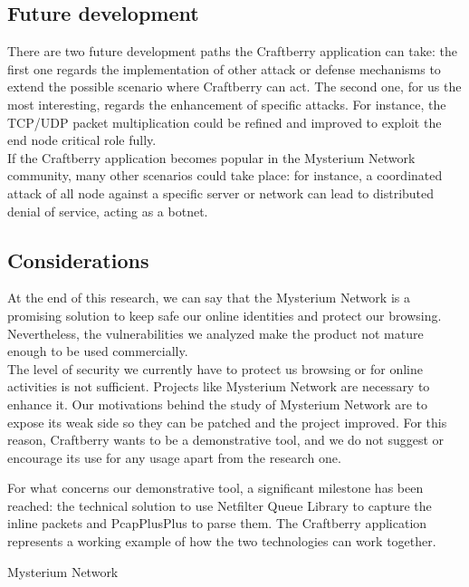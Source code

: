 \documentclass[12pt]{article}
\begin{document}
		\subsection{Future development}
			There are two future development paths the Craftberry application can take: the first one regards the implementation of other attack or defense mechanisms to extend the possible scenario where Craftberry can act. The second one, for us the most interesting, regards the enhancement of specific attacks. For instance, the TCP/UDP packet multiplication could be refined and improved to exploit the end node critical role fully.\\
			If the Craftberry application becomes popular in the Mysterium Network community, many other scenarios could take place: for instance, a coordinated attack of all node against a specific server or network can lead to distributed denial of service, acting as a botnet.\\

			\subsection{Considerations}
			At the end of this research, we can say that the Mysterium Network is a promising solution to keep safe our online identities and protect our browsing. Nevertheless, the vulnerabilities we analyzed make the product not mature enough to be used commercially.\\
			The level of security we currently have to protect us browsing or for online activities is not sufficient. Projects like Mysterium Network are necessary to enhance it. Our motivations behind the study of Mysterium Network are to expose its weak side so they can be patched and the project improved. For this reason, Craftberry wants to be a demonstrative tool, and we do not suggest or encourage its use for any usage apart from the research one.
			
			\bigbreak

			For what concerns our demonstrative tool, a significant milestone has been reached: the technical solution to use Netfilter Queue Library to capture the inline packets and PcapPlusPlus to parse them. The Craftberry application represents a working example of how the two technologies can work together.

			\bigbreak

			Mysterium Network

	\pagebreak
\end{document}
